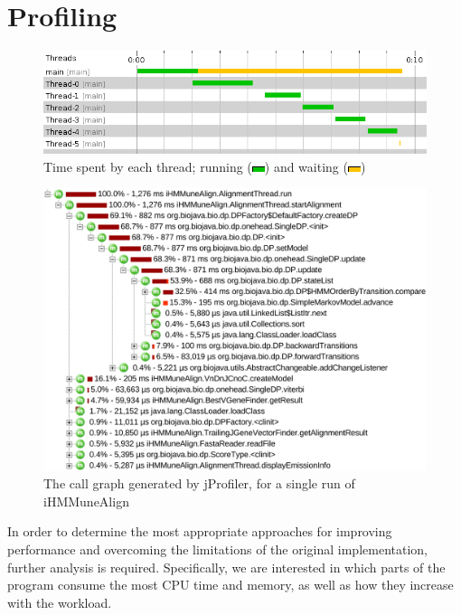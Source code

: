 \section{Profiling}
\begin{figure}[p]
  \centering
  \includegraphics[width=\textwidth]{threads-graph.png}
  \caption{Time spent by each thread;
  running (\protect\includegraphics{jprofiler_images/ff00c400_bff000000.png}) and
  waiting (\protect\includegraphics{jprofiler_images/ffffc400_bff000000.png})}
  \label{fig:threadgraph}
\end{figure}
\begin{figure}[p]
  \includegraphics[width=\textwidth]{call-tree.pdf}
 \caption{The call graph generated by jProfiler, for a single run of iHMMuneAlign}
 \label{fig:callgraph}
\end{figure}
In order to determine the most appropriate approaches for improving performance and overcoming the limitations of the original implementation, further analysis is required. Specifically, we are interested in which parts of the program consume the most CPU time and memory, as well as how they increase with the workload.

